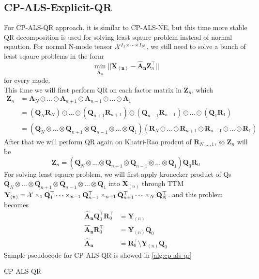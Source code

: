 \documentclass{article}
\newcommand{\mat}[1]{\mathbf{#1}}
\newcommand{\T}[2][]{#1{\mathbf{\cal{#2}}}} 						%
\begin{document}
\subsection{CP-ALS-Explicit-QR}
For CP-ALS-QR approach, it is similar to CP-ALS-NE, but this time more stable QR decomposition is used for solving least sqaure
problem instead of normal eqaution.
For normal N-mode tensor $\T{X}^{I_1 \times \dots \times I_N}$, we still need to solve a bunch of least sqaure problems in the form
$$\min_{\mat{\hat{A}}_n}||\mat{X_{(n)}} - {\mat{\hat{A}_n}}\mat{Z}^\top_n ||$$
for every mode.\\
This time we will first perform QR on each factor matrix in $\mat{Z}_n$, which 
\begin{align}
  \mat{Z}_n &= \mat{A}_N \odot \dots \odot \mat{A}_{n+1} \odot \mat{A}_{n-1} \odot \dots \odot \mat{A}_1 \nonumber \\
  &= (\mat{Q}_N\mat{R}_N) \odot \dots \odot (\mat{Q}_{n+1}\mat{R}_{n+1}) \odot (\mat{Q}_{n-1}\mat{R}_{n-1}) \odot \dots \odot (\mat{Q}_1\mat{R}_1) \nonumber \\
  &= (\mat{Q}_N \otimes \dots \otimes \mat{Q}_{n+1} \otimes \mat{Q}_{n-1} \otimes \dots \otimes \mat{Q}_1)(\mat{R}_N \odot \dots \odot \mat{R}_{n+1} \odot \mat{R}_{n-1} \odot \dots \odot \mat{R}_1)\nonumber  
\end{align}
After that we will perform QR again on Khatri-Rao prodcut of $\mat{R}_{N,\dots,1}$, so $\mat{Z}_n$ will be
$$\mat{Z}_n = (\mat{Q}_N \otimes \dots \otimes \mat{Q}_{n+1} \otimes \mat{Q}_{n-1} \otimes \dots \otimes \mat{Q}_1)\mat{Q}_0\mat{R}_0$$
For solving least sqaure problem, we will first apply kronecker product of Qs 
$\mat{Q}_N \otimes \dots \otimes \mat{Q}_{n+1} \otimes \mat{Q}_{n-1} \otimes \dots \otimes \mat{Q}_1$ into $\mat{X}_{(n)}$ through TTM 
$\mat{Y}_{(n)} =  \T{X} \times_1 \mat{Q}_1^\top \dots \times_{n-1} \mat{Q}_{n-1}^\top \times_{n+1} \mat{Q}_{n+1}^\top \dots \times_N \mat{Q}_N^\top$.
and this problem becomes
\begin{align}
  \mat{\hat{A}_n}\mat{Q}_0^\top \mat{R}_0^\top &= \mat{Y}_{(n)} \nonumber \\
  \mat{\hat{A}_n}\mat{R}_0^\top &= \mat{Y}_{(n)} \mat{Q}_0 \nonumber \\
  \mat{\hat{A}_n} &= \mat{R}_0^\top \text{\textbackslash} \mat{Y}_{(n)} \mat{Q}_0 \nonumber
\end{align}
Sample pseudocode for CP-ALS-QR is showed in \cref{alg:cp-als-qr}
\begin{algorithm}
  \caption{CP-ALS-QR}
  \label{alg:cp-als-qr}
  
\end{algorithm}
\end{document}

